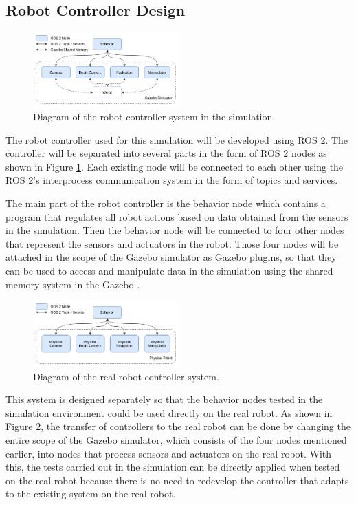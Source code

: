 \subsection{Robot Controller Design}
\label{subsec:controllerdesign}

\begin{figure} [ht]
  \centering
  \includegraphics[width=0.5\textwidth]{images/simulation-controller.png}
  \caption{Diagram of the robot controller system in the simulation.}
  \label{fig:simulationcontroller}
\end{figure}

The robot controller used for this simulation will be developed using ROS 2.
The controller will be separated into several parts in the form of ROS 2 nodes as shown in Figure \ref{fig:simulationcontroller}.
Each existing node will be connected to each other using the ROS 2's interprocess communication system in the form of topics and services.

The main part of the robot controller is the behavior node which contains a program that regulates all robot actions based on data obtained from the sensors in the simulation.
Then the behavior node will be connected to four other nodes that represent the sensors and actuators in the robot.
Those four nodes will be attached in the scope of the Gazebo simulator as Gazebo plugins,
  so that they can be used to access and manipulate data in the simulation using the shared memory system in the Gazebo \citep{gazeboplugins}.

\begin{figure} [ht] \centering
  \includegraphics[width=0.5\textwidth]{images/real-robot-controller.png}
  \caption{Diagram of the real robot controller system.}
  \label{fig:realrobotcontroller}
\end{figure}

This system is designed separately so that the behavior nodes tested in the simulation environment could be used directly on the real robot.
As shown in Figure \ref{fig:realrobotcontroller},
  the transfer of controllers to the real robot can be done by changing the entire scope of the Gazebo simulator,
  which consists of the four nodes mentioned earlier,
  into nodes that process sensors and actuators on the real robot.
With this, the tests carried out in the simulation can be directly applied when tested on the real robot because there is no need to redevelop the controller that adapts to the existing system on the real robot.
